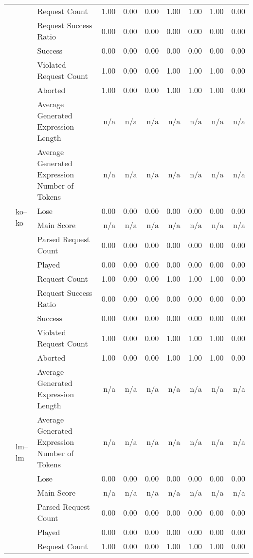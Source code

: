 \begin{tabular}{lllrrrrrrr}
 &  & Request Count & 1.00 & 0.00 & 0.00 & 1.00 & 1.00 & 1.00 & 0.00 \\
 &  & Request Success Ratio & 0.00 & 0.00 & 0.00 & 0.00 & 0.00 & 0.00 & 0.00 \\
 &  & Success & 0.00 & 0.00 & 0.00 & 0.00 & 0.00 & 0.00 & 0.00 \\
 &  & Violated Request Count & 1.00 & 0.00 & 0.00 & 1.00 & 1.00 & 1.00 & 0.00 \\
\cline{2-10}
 & \multirow[t]{11}{*}{ko--ko} & Aborted & 1.00 & 0.00 & 0.00 & 1.00 & 1.00 & 1.00 & 0.00 \\
 &  & Average Generated Expression Length & n/a & n/a & n/a & n/a & n/a & n/a & n/a \\
 &  & Average Generated Expression Number of Tokens & n/a & n/a & n/a & n/a & n/a & n/a & n/a \\
 &  & Lose & 0.00 & 0.00 & 0.00 & 0.00 & 0.00 & 0.00 & 0.00 \\
 &  & Main Score & n/a & n/a & n/a & n/a & n/a & n/a & n/a \\
 &  & Parsed Request Count & 0.00 & 0.00 & 0.00 & 0.00 & 0.00 & 0.00 & 0.00 \\
 &  & Played & 0.00 & 0.00 & 0.00 & 0.00 & 0.00 & 0.00 & 0.00 \\
 &  & Request Count & 1.00 & 0.00 & 0.00 & 1.00 & 1.00 & 1.00 & 0.00 \\
 &  & Request Success Ratio & 0.00 & 0.00 & 0.00 & 0.00 & 0.00 & 0.00 & 0.00 \\
 &  & Success & 0.00 & 0.00 & 0.00 & 0.00 & 0.00 & 0.00 & 0.00 \\
 &  & Violated Request Count & 1.00 & 0.00 & 0.00 & 1.00 & 1.00 & 1.00 & 0.00 \\
\cline{2-10}
 & \multirow[t]{11}{*}{lm--lm} & Aborted & 1.00 & 0.00 & 0.00 & 1.00 & 1.00 & 1.00 & 0.00 \\
 &  & Average Generated Expression Length & n/a & n/a & n/a & n/a & n/a & n/a & n/a \\
 &  & Average Generated Expression Number of Tokens & n/a & n/a & n/a & n/a & n/a & n/a & n/a \\
 &  & Lose & 0.00 & 0.00 & 0.00 & 0.00 & 0.00 & 0.00 & 0.00 \\
 &  & Main Score & n/a & n/a & n/a & n/a & n/a & n/a & n/a \\
 &  & Parsed Request Count & 0.00 & 0.00 & 0.00 & 0.00 & 0.00 & 0.00 & 0.00 \\
 &  & Played & 0.00 & 0.00 & 0.00 & 0.00 & 0.00 & 0.00 & 0.00 \\
 &  & Request Count & 1.00 & 0.00 & 0.00 & 1.00 & 1.00 & 1.00 & 0.00 \\

\end{tabular}
